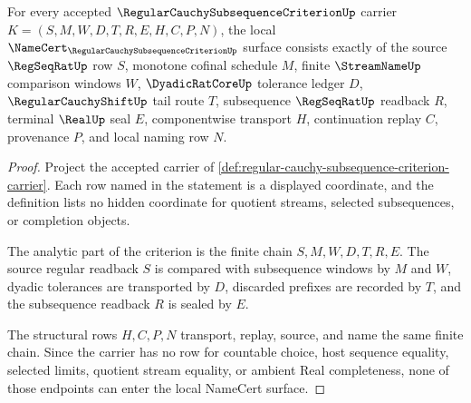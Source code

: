 \begin{theorem}
\label{thm:regular-cauchy-subsequence-criterion-namecert-obligations}
For every accepted $\RegularCauchySubsequenceCriterionUp$ carrier $K=(S,M,W,D,T,R,E,H,C,P,N)$, the local $\NameCert_{\RegularCauchySubsequenceCriterionUp}$ surface consists exactly of the source $\RegSeqRatUp$ row $S$, monotone cofinal schedule $M$, finite $\StreamNameUp$ comparison windows $W$, $\DyadicRatCoreUp$ tolerance ledger $D$, $\RegularCauchyShiftUp$ tail route $T$, subsequence $\RegSeqRatUp$ readback $R$, terminal $\RealUp$ seal $E$, componentwise transport $H$, continuation replay $C$, provenance $P$, and local naming row $N$.
\end{theorem}
\begin{proof}
Project the accepted carrier of \autoref{def:regular-cauchy-subsequence-criterion-carrier}. Each row named in the statement is a displayed coordinate, and the definition lists no hidden coordinate for quotient streams, selected subsequences, or completion objects.

The analytic part of the criterion is the finite chain $S,M,W,D,T,R,E$. The source regular readback $S$ is compared with subsequence windows by $M$ and $W$, dyadic tolerances are transported by $D$, discarded prefixes are recorded by $T$, and the subsequence readback $R$ is sealed by $E$.

The structural rows $H,C,P,N$ transport, replay, source, and name the same finite chain. Since the carrier has no row for countable choice, host sequence equality, selected limits, quotient stream equality, or ambient Real completeness, none of those endpoints can enter the local NameCert surface.
\end{proof}

